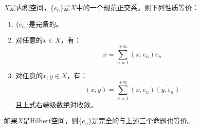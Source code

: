 \begin{theorem}\label{theo:OthonormalSystem}
	$X$是内积空间，$\{e_n\}$是$X$中的一个规范正交系。则下列性质等价：
	\begin{enumerate}
		\item $\{e_n\}$是完备的。
		\item 对任意的$x\in X$，有：
		\begin{equation*}
			x=\sum_{n=1}^{+\infty}(x,e_n)e_n
		\end{equation*}
		\item 对任意的$x,y\in X$，有：
		\begin{equation*}
			(x,y)=\sum_{n=1}^{+\infty}(x,e_n)\overline{(y,e_n)}
		\end{equation*}
		且上式右端级数绝对收敛。
	\end{enumerate}
	如果$X$是Hilbert空间，则$\{e_n\}$是完全的与上述三个命题也等价。
\end{theorem}

